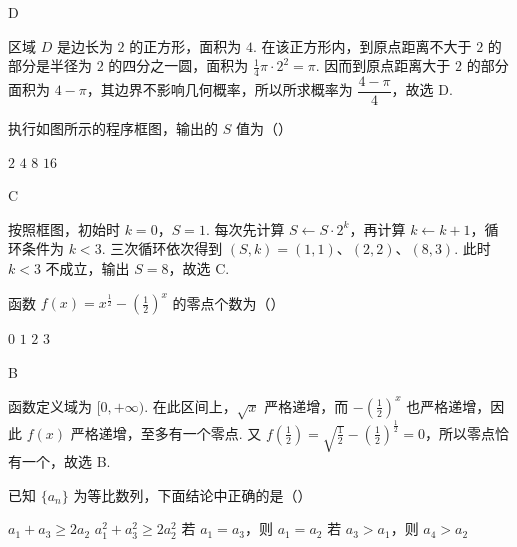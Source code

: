 \begin{answer}
D
\end{answer}

\begin{solution}
区域 \(D\) 是边长为 \(2\) 的正方形，面积为 \(4\). 在该正方形内，到原点距离不大于 \(2\) 的部分是半径为 \(2\) 的四分之一圆，面积为 \(\frac{1}{4}\pi\cdot2^2=\pi\). 因而到原点距离大于 \(2\) 的部分面积为 \(4-\pi\)，其边界不影响几何概率，所以所求概率为 \(\dfrac{4-\pi}{4}\)，故选 D.
\end{solution}

\begin{problem}
执行如图所示的程序框图，输出的 \(S\) 值为（\quad）


\choices
    {\(2\)}
    {\(4\)}
    {\(8\)}
    {\(16\)}
\end{problem}

\begin{answer}
C
\end{answer}

\begin{solution}
按照框图，初始时 \(k=0\)，\(S=1\). 每次先计算 \(S\leftarrow S\cdot2^k\)，再计算 \(k\leftarrow k+1\)，循环条件为 \(k<3\). 三次循环依次得到
\((S,k)=(1,1)\)、\((2,2)\)、\((8,3)\).
此时 \(k<3\) 不成立，输出 \(S=8\)，故选 C.
\end{solution}

\begin{problem}
函数 \(f(x) = x^{\frac{1}{2}} - \left(\frac{1}{2}\right)^x\) 的零点个数为（\quad）

\choices
    {\(0\)}
    {\(1\)}
    {\(2\)}
    {\(3\)}
\end{problem}

\begin{answer}
B
\end{answer}

\begin{solution}
函数定义域为 \([0,+\infty)\). 在此区间上，\(\sqrt{x}\) 严格递增，而 \(-\left(\frac{1}{2}\right)^x\) 也严格递增，因此 \(f(x)\) 严格递增，至多有一个零点. 又
\(f\left(\frac{1}{2}\right)=\sqrt{\frac{1}{2}}-\left(\frac{1}{2}\right)^{\frac{1}{2}}=0\)，所以零点恰有一个，故选 B.
\end{solution}

\begin{problem}
已知 \(\{a_n\}\) 为等比数列，下面结论中正确的是（\quad）

\choices
    {\(a_{1} + a_{3} \geqslant 2a_{2}\)}
    {\(a_{1}^{2} + a_{3}^{2} \geqslant 2a_{2}^{2}\)}
    {\(\text{若 }a_{1}=a_{3}\text{，则 }a_{1}=a_{2}\)}
    {\(\text{若 }a_{3}>a_{1}\text{，则 }a_{4}>a_{2}\)}
\end{problem}

